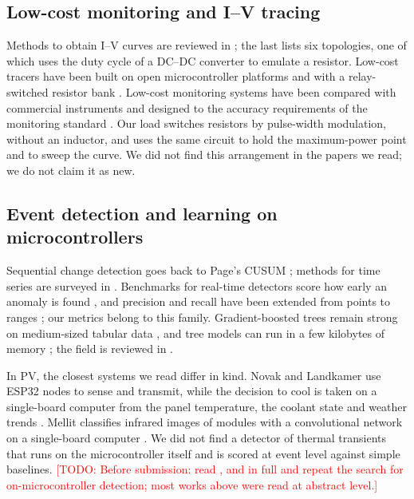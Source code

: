 \documentclass[conference]{IEEEtran}
\newcommand{\todo}[1]{\textcolor{red}{[TODO: #1]}}
\begin{document}
\subsection{Low-cost monitoring and I--V tracing}
Methods to obtain I--V curves are reviewed in \cite{duran2008,zhu2020,morales2021}; the
last lists six topologies, one of which uses the duty cycle of a DC--DC converter to
emulate a resistor. Low-cost tracers have been built on open microcontroller platforms
\cite{papageorgas2015} and with a relay-switched resistor bank \cite{machado2025}.
Low-cost monitoring systems have been compared with commercial instruments
\cite{paredes2018} and designed to the accuracy requirements of the monitoring standard
\cite{lopezvargas2019,iec61724}. Our load switches resistors by pulse-width modulation,
without an inductor, and uses the same circuit to hold the maximum-power point and to
sweep the curve. We did not find this arrangement in the papers we read; we do not
claim it as new.

\subsection{Event detection and learning on microcontrollers}
Sequential change detection goes back to Page's CUSUM \cite{page1954}; methods for time
series are surveyed in \cite{aminikhanghahi2017}. Benchmarks for real-time detectors
score how early an anomaly is found \cite{lavin2015}, and precision and recall have been
extended from points to ranges \cite{tatbul2018}; our metrics belong to this family.
Gradient-boosted trees \cite{ke2017} remain strong on medium-sized tabular data
\cite{grinsztajn2022}, and tree models can run in a few kilobytes of memory
\cite{kumar2017}; the field is reviewed in \cite{ray2022}.

In PV, the closest systems we read differ in kind. Novak and Landkamer use ESP32 nodes
to sense and transmit, while the decision to cool is taken on a single-board computer
from the panel temperature, the coolant state and weather trends \cite{novak2026}.
Mellit classifies infrared images of modules with a convolutional network on a
single-board computer \cite{mellit2022}. We did not find a detector of thermal
transients that runs on the microcontroller itself and is scored at event level against
simple baselines. \todo{Before submission: read \cite{herteleer2023}, \cite{king1997}
and \cite{novak2026} in full and repeat the search for on-microcontroller detection;
most works above were read at abstract level.}
\end{document}
